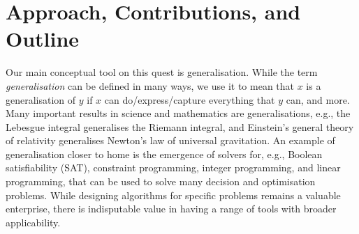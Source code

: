 


\section{Approach, Contributions, and Outline} %


Our main conceptual tool on this quest is generalisation. While the term \emph{generalisation} can be defined in many ways, we use it to mean that $x$ is a generalisation of $y$ if $x$ can do/express/capture everything that $y$ can, and more. Many important results in science and mathematics are generalisations, e.g., the Lebesgue integral generalises the Riemann integral, and Einstein's general theory of relativity generalises Newton's law of universal gravitation. An example of generalisation closer to home is the emergence of solvers for, e.g., Boolean satisfiability (SAT), constraint programming, integer programming, and linear programming, that can be used to solve many decision and optimisation problems. While designing algorithms for specific problems remains a valuable enterprise, there is indisputable value in having a range of tools with broader applicability.


